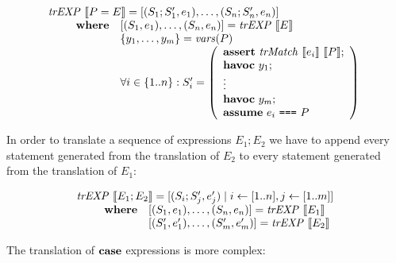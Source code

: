 \[
\begin{array}{l}
\mathit{trEXP}~\llbracket P = E\rrbracket = [(S_1;S_1',e_1), \dots, (S_n;S_n', e_n)] \\
\qquad 
\begin{array}{ll}
\textbf{where} & [(S_1,e_1),\dots,(S_n, e_n)] = \mathit{trEXP}~\llbracket E\rrbracket \\
& \{y_1, \ldots, y_m\} = \mathit{vars}(P) \\
& \forall i \in \{1..n\}: S_i' = \left(
\begin{array}{l}
\textbf{assert}~\mathit{trMatch}~\llbracket e_i\rrbracket~\llbracket P\rrbracket;\\
\textbf{havoc}~y_1;\\
\vdots\\
\textbf{havoc}~y_m;\\
\textbf{assume}~e_i ~\texttt{===}~ P\\
\end{array}
\right)
\end{array}
\end{array}
\]

In order to translate a sequence of expressions $E_1;E_2$ we have to append every 
statement generated from the translation of $E_2$ to every statement generated from
the translation of $E_1$:

\[
\begin{array}{l}
\mathit{trEXP}~\llbracket E_1;E_2\rrbracket = [(S_i;S_j',e'_j) \mid i \leftarrow [1..n], j \leftarrow [1..m]] \\
\qquad 
\begin{array}{ll}
\textbf{where} & [(S_1,e_1),\dots,(S_n, e_n)] = \mathit{trEXP}~\llbracket E_1\rrbracket \\
& [(S_1',e'_1),\dots,(S_m', e'_m)] = \mathit{trEXP}~\llbracket E_2\rrbracket \\
\end{array}
\end{array}
\]

The translation of $\textbf{case}$ expressions is more complex:

